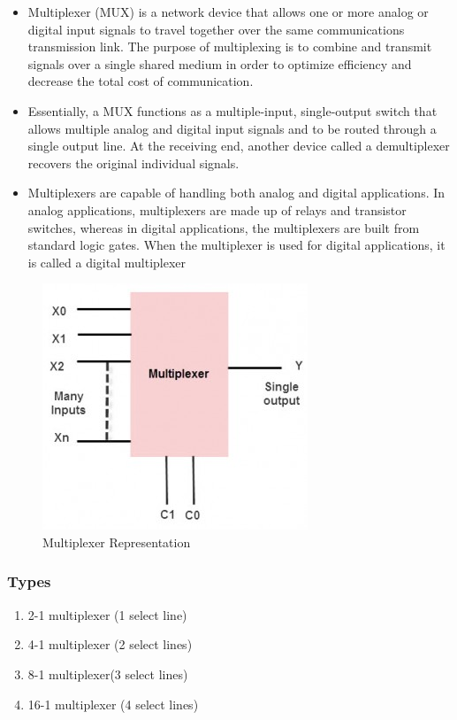 \documentclass[11pt]{article}
\begin{document}
\begin{itemize}
	\item Multiplexer (MUX) is a network device that allows one or more analog or digital input signals to travel together over the same communications transmission link. The purpose of multiplexing is to combine and transmit signals over a single shared medium in order to optimize efficiency and decrease the total cost of communication.
	\item Essentially, a MUX functions as a multiple-input, single-output switch that allows multiple analog and digital input signals and to be routed through a single output line. At the receiving end, another device called a demultiplexer recovers the original individual signals.
	\item Multiplexers are capable of handling both analog and digital applications. In analog applications, multiplexers are made up of relays and transistor switches, whereas in digital applications, the multiplexers are built from standard logic gates. When the multiplexer is used for digital applications, it is called a digital multiplexer

\end{itemize}

\begin{figure}[H]
	\centering
	\includegraphics[scale = 0.5]{mux.jpg}
	\caption{Multiplexer Representation}
\end{figure}

\subsubsection{Types}
\begin{enumerate}
	\item 2-1 multiplexer (1 select line)
	\item 4-1 multiplexer (2 select lines)
	\item 8-1 multiplexer(3 select lines)
	\item 16-1 multiplexer (4 select lines)

\end{enumerate}
\end{document}
